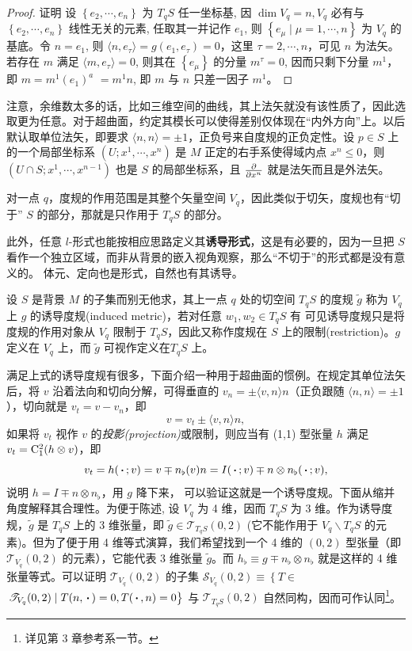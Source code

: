 \begin{proof}
    证明 设 $\left\{e_2, \cdots,e_n\right\}$ 为 $T_q S$ 任一坐标基, 因 $\dim V_q=n, V_q$ 必有与 $\left\{e_2,\cdots,e_n\right\}$ 线性无关的元素, 任取其一并记作 $e_1$, 则 $\left\{e_\mu\mid\mu=1, \cdots, n\right\}$ 为 $V_q$ 的基底。令 $n=e_1$, 则 $\langle n, e_\tau\rangle =g(e_1,e_\tau)=0$，这里 $\tau=2,\cdots,n$，可见 $n$ 为法矢。若存在 $m$ 满足 $\langle m,e_\tau\rangle=0$, 则其在 $\left\{e_\mu\right\}$ 的分量 $m^\tau=0$, 因而只剩下分量 $m^1$，即 $m=m^1\left(e_1\right)^a$ $=m^1n$, 即 $m$ 与 $n$ 只差一因子 $m^1$。
\end{proof}
注意，余维数太多的话，比如三维空间的曲线，其上法矢就没有该性质了，因此选取更为任意。对于超曲面，约定其模长可以使得差别仅体现在“内外方向”上。以后默认取单位法矢，即要求 $\langle n,n\rangle=\pm 1$，正负号来自度规的正负定性。设 $p\in S$ 上的一个局部坐标系 $(U;x^1,\cdots,x^{n})$ 是 $M$ 正定的右手系使得域内点 $x^n\leqslant 0$，则$(U\cap S;x^1,\cdots,x^{n-1})$ 也是 $S$ 的局部坐标系，且 $\pdv{x^n}$ 就是法矢而且是外法矢。

对一点 $q$，度规的作用范围是其整个矢量空间 $V_q$，因此类似于切矢，度规也有“切于” $S$ 的部分，那就是只作用于 $T_qS$ 的部分。


此外，任意 $l$-形式也能按相应思路定义其\textbf{诱导形式}，这是有必要的，因为一旦把 $S$ 看作一个独立区域，而非从背景的嵌入视角观察，那么“不切于”的形式都是没有意义的。
体元、定向也是形式，自然也有其诱导。

\begin{definition}[诱导度规]
    设 $S$ 是背景 $M$ 的子集而别无他求，其上一点 $q$ 处的切空间 $T_q S$ 的度规 $\tilde g$ 称为 $V_q$ 上 $g$ 的诱导度规(induced metric)，若对任意 $w_1,w_2\in T_q S$ 有
    可见诱导度规只是将度规的作用对象从 $V_q$ 限制于 $T_q S$，因此又称作度规在 $S$ 上的限制(restriction)。$g$ 定义在 $V_q$ 上，而 $\tilde g$ 可视作定义在$T_q S$ 上。
\end{definition}
满足上式的诱导度规有很多，下面介绍一种用于超曲面的惯例。在规定其单位法矢后，将 $v$ 沿着法向和切向分解，可得垂直的 $v_n=\pm\langle v,n\rangle n$（正负跟随 $\langle n,n\rangle=\pm 1$），切向就是 $v_t=v-v_n$，即
\[
v=v_t\pm\langle v,n\rangle n,
\]
如果将 $v_t$ 视作 $v$ 的\textit{投影(projection)}或限制，则应当有 (1,1) 型张量 $h$ 满足 $v_t=\mathrm{C}_1^2(h\otimes v)$，即
\[
v_t=h(\oo;v)=v\mp  n_\flat(v)n=I(\oo;v)\mp  n\otimes n_\flat(\oo;v),
\]
说明 $h=I\mp  n\otimes n_\flat$，用 $g$ 降下来，
可以验证这就是一个诱导度规。下面从缩并角度解释其合理性。为便于陈述, 设 $V_q$ 为 4 维，因而 $T_q S$ 为 3 维。作为诱导度规，$\tilde g$ 是 $T_q S$ 上的 3 维张量，即 $\tilde g \in \mathscr{T}_{T_q S}(0,2)$ (它不能作用于 $V_q\backslash T_q S$ 的元素)。但为了便于用 4 维等式演算，我们希望找到一个 4 维的 $(0,2)$ 型张量（即 $\mathscr{T}_{V_q}(0,2)$ 的元素），它能代表 3 维张量 $\tilde g$。而 $h_\flat \equiv g \mp n_\flat\otimes n_\flat$ 就是这样的 4 维张量等式。可以证明 $\mathscr{T}_{V_q}(0,2)$ 的子集 $\mathscr{S}_{V_q}(0,2) \equiv\left\{T \in\right.$ $\left.\mathscr{T}_{V_q}(0,2) \mid T( n,\oo)=0,T(\oo,n)=0\right\}$ 与 $\mathscr{T}_{T_q S}(0,2)$ 自然同构，因而可作认同\footnote{详见第 3 章参考系一节。}。

